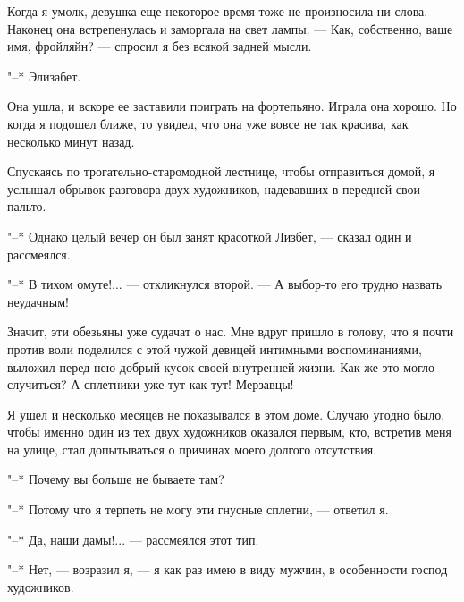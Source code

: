 Когда  я умолк,  девушка еще  некоторое время  тоже не  произносила ни
слова. Наконец она  встрепенулась и заморгала на свет  лампы. --- Как,
собственно, ваше имя, фройляйн? --- спросил я без всякой задней мысли.

"--* Элизабет.

Она ушла,  и вскоре  ее заставили поиграть  на фортепьяно.  Играла она
хорошо. Но когда я подошел ближе, то  увидел, что она уже вовсе не так
красива, как несколько минут назад.

Спускаясь  по  трогательно-старомодной   лестнице,  чтобы  отправиться
домой,  я  услышал обрывок  разговора  двух  художников, надевавших  в
передней свои пальто.

"--* Однако целый вечер он был занят красоткой Лизбет, --- сказал один
и рассмеялся.

"--*  В тихом  омуте!... ---  откликнулся второй.  --- А  выбор-то его
трудно назвать неудачным!

Значит, эти  обезьяны уже судачат  о нас.  Мне вдруг пришло  в голову,
что  я почти  против воли  поделился  с этой  чужой девицей  интимными
воспоминаниями, выложил перед нею добрый кусок своей внутренней жизни.
Как же это могло случиться? А сплетники уже тут как тут! Мерзавцы!

Я ушел и  несколько месяцев не показывался в этом  доме. Случаю угодно
было, чтобы именно  один из тех двух художников  оказался первым, кто,
встретив меня  на улице,  стал допытываться  о причинах  моего долгого
отсутствия.

"--* Почему вы больше не бываете там?

"--* Потому что я терпеть не могу эти гнусные сплетни, --- ответил я.

"--* Да, наши дамы!... --- рассмеялся этот тип.

"--*  Нет, ---  возразил  я, ---  я  как  раз имею  в  виду мужчин,  в
особенности господ художников.

